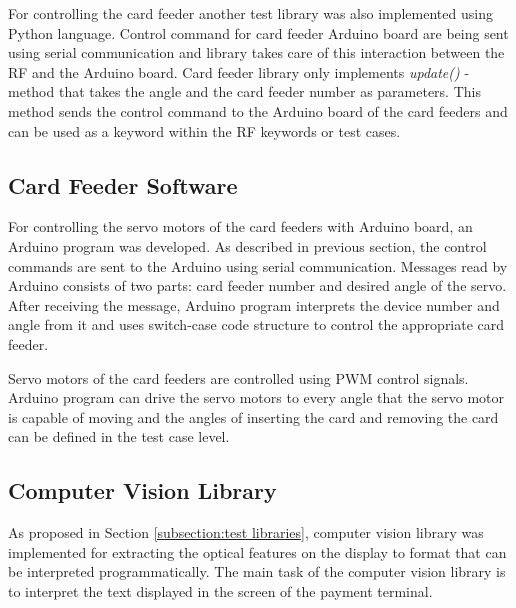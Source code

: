 For controlling the card feeder another test library was also implemented using Python language. Control command for card feeder Arduino board are being sent using serial communication and library takes care of this interaction between the RF and the Arduino board. Card feeder library only implements \emph{update()} -method that takes the angle and the card feeder number as parameters. This method sends the control command to the Arduino board of the card feeders and can be used as a keyword within the RF keywords or test cases.

\subsection{Card Feeder Software}
\label{subsection:card feeder software}

For controlling the servo motors of the card feeders with Arduino board, an Arduino program was developed. As described in previous section, the control commands are sent to the Arduino using serial communication. Messages read by Arduino consists of two parts: card feeder number and desired angle of the servo. After receiving the message, Arduino program interprets the device number and angle from it and uses switch-case code structure to control the appropriate card feeder. 

Servo motors of the card feeders are controlled using PWM control signals. Arduino program can drive the servo motors to every angle that the servo motor is capable of moving and the angles of inserting the card and removing the card can be defined in the test case level.

\subsection{Computer Vision Library}
\label{subsection:Computer vision library}

As proposed in Section \ref{subsection:test libraries}, computer vision library was implemented for extracting the optical features on the display to format that can be interpreted programmatically. The main task of the computer vision library is to interpret the text displayed in the screen of the payment terminal.


